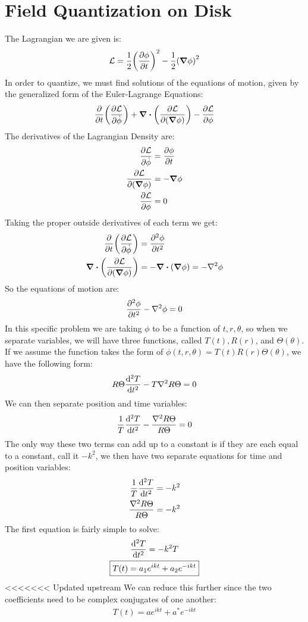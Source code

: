 \documentclass[12pt]{article}
\renewcommand{\L}{\mathcal{L}}
\begin{document}
\section{Field Quantization on Disk}
The Lagrangian we are given is:
\begin{align*}
  \L=\frac12\qty(\pdv{\phi}{t})^2-\frac12\qty(\grad\phi)^2
\end{align*}
In order to quantize, we must find solutions of the equations of motion, given by the generalized form of the Euler-Lagrange Equations:
\begin{align*}
  \pdv{t}\qty(\pdv{\L}{\dot{\phi}})
  +\div\qty(\pdv{\L}{(\grad{\phi})})
  -\pdv{\L}{\phi}
\end{align*}
The derivatives of the Lagrangian Density are:
\begin{align*}
  \pdv{\L}{\dot{\phi}}&=\pdv{\phi}{t}\\
  \pdv{\L}{(\grad{\phi})}&=-\grad{\phi}\\
  \pdv{\L}{\phi}&=0
\end{align*}
Taking the proper outside derivatives of each term we get:
\begin{align*}
  \pdv{t}\qty(\pdv{\L}{\dot{\phi}})&=\pdv[2]{\phi}{t}\\
  \div\qty(\pdv{\L}{(\grad{\phi})})&=-\div{(\grad{\phi})}=-\laplacian{\phi}
\end{align*}
So the equations of motion are:
\begin{align*}
  \pdv[2]{\phi}{t}-\laplacian{\phi}=0
\end{align*}
In this specific problem we are taking $\phi$ to be a function of $t,r,\theta$, so when we separate variables, we will have three functions, called $T(t),R(r)$, and $\Theta(\theta)$. If we assume the function takes the form of $\phi(t,r,\theta)=T(t)R(r)\Theta(\theta)$, we have the following form:
\begin{align*}
  R\Theta\dv[2]{T}{t}-T\laplacian{R\Theta}=0
\end{align*}
We can then separate position and time variables:
\begin{align*}
  \frac1T\dv[2]{T}{t}-\frac{\laplacian{R\Theta}}{R\Theta}=0
\end{align*}
The only way these two terms can add up to a constant is if they are each equal to a constant, call it $-k^2$, we then have two separate equations for time and position variables:
\begin{align*}
  \frac1T\dv[2]{T}{t}&=-k^2\\
  \frac{\laplacian{R\Theta}}{R\Theta}&=-k^2
\end{align*}
The first equation is fairly simple to solve:
\begin{gather*}
  \dv[2]{T}{t}=-k^2T\\
  \boxed{T(t)=a_1e^{ikt}+a_2e^{-ikt}}
\end{gather*}
<<<<<<< Updated upstream
We can reduce this further since the two coefficients need to be complex conjugates of one another:
\begin{align*}
  T(t)=ae^{ikt}+a^*e^{-ikt}
\end{align*}
\end{document}
